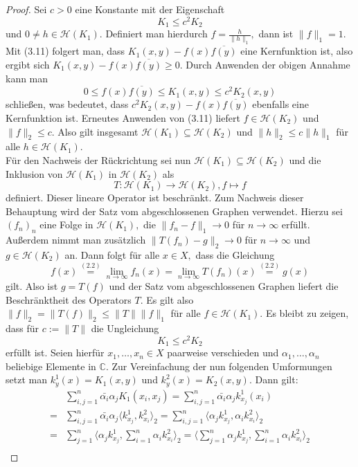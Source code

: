\documentclass[12pt,titlepage,twoside,cleardoublepage]{article}
\theoremstyle{nummermitklammern}
\numberwithin{equation}{section}
\begin{document}
\begin{proof}
Sei $c>0$ eine Konstante mit der Eigenschaft
\[
K_1\leq c^2K_2
\]  und $0 \neq h\in \mathcal{H}(K_1).$ Definiert man hierdurch $f=\frac{h}{\|h\|_1},$ dann ist $\|f\|_1=1.$
 Mit (3.11) folgert man, dass $K_1(x,y)-f(x)\overline{ f(y)}$ eine Kernfunktion ist, also ergibt sich $K_1(x,y)-f(x)\overline{ f(y)}\geq 0.$ 
Durch Anwenden der obigen Annahme kann man 
\[
0\leq f(x)\overline{ f(y)}\leq K_1(x,y)\leq c^2K_2(x,y)
\]
 schließen, was bedeutet, dass  $c^2K_2(x,y)-f(x)\overline{f(y)}$ ebenfalls eine Kernfunktion ist. Erneutes Anwenden von (3.11) liefert $f\in \mathcal{H}(K_2)$ und $\|f\|_2\leq c.$
Also gilt insgesamt $\mathcal{H}(K_1)\subseteq \mathcal{H}(K_2)$ und $\|h\|_2\leq c\|h\|_1$ für alle $h\in \mathcal{H}(K_1).$\\
Für den Nachweis der Rückrichtung sei nun $\mathcal{H}(K_1)\subseteq \mathcal{H}(K_2)$ und die Inklusion von $\mathcal{H}(K_1)$ in $\mathcal{H}(K_2)$ als
\[
T:\mathcal{H}(K_1) \to \mathcal{H}(K_2),f\mapsto f
\] definiert. Dieser lineare Operator ist beschränkt. Zum Nachweis dieser Behauptung wird der Satz vom abgeschlossenen Graphen verwendet.
Hierzu sei $(f_n)_n$ eine Folge in $\mathcal{H}(K_1),$ die $\|f_n-f\|_1\to 0$ für $n\to \infty$ erfüllt. Außerdem nimmt man zusätzlich $\|T(f_n)-g\|_2\to 0 $ für $n\to \infty$ und $g\in \mathcal{H}(K_2)$ an. Dann folgt für alle $x\in X,$ dass die Gleichung
\[
f(x)\overset{(2.2)}{=}\lim_{n\rightarrow \infty} f_n(x)=\lim_{n\rightarrow \infty} T(f_n)(x)\overset{(2.2)}{=}g(x)
\] gilt.
Also ist $g=T(f)$ und der Satz vom abgeschlossenen Graphen liefert die Beschränktheit des Operators $T$. Es gilt also
$\|f\|_2=\|T(f)\|_2\leq \|T\|\|f\|_1$ für alle $f\in \mathcal{H}(K_1).$ Es bleibt zu zeigen, dass für $c:=\|T\|$ die Ungleichung
\[
K_1\leq c^2K_2 
\] erfüllt ist. Seien hierfür $x_1,\ldots, x_n\in X$ paarweise verschieden und $\alpha_1,\ldots ,\alpha_n$ beliebige Elemente in $ \mathbb{C}.$ Zur Vereinfachung der nun folgenden Umformungen setzt man $k^1_y(x)=K_1(x,y)$ und $k^2_y(x)=K_2(x,y).$ Dann gilt:
\begin{align*}
&\sum_{i,j=1}^n\bar{\alpha_i}\alpha_jK_1(x_i,x_j)
=\sum_{i,j=1}^n \bar{\alpha_i}\alpha_j k^1_{x_j}(x_i)\\
=&\sum_{i,j=1}^n \bar{\alpha_i}\alpha_j \langle k^1_{x_j},k^2_{x_i}\rangle_2
=\sum_{i,j=1}^n \langle \alpha_j k^1_{x_j},\alpha_ik^2_{x_i}\rangle_2\\
=&\sum_{j=1}^n \langle \alpha_j k^1_{x_j},\sum_{i=1}^n\alpha_ik^2_{x_i}\rangle_2
= \langle\sum_{j=1}^n \alpha_j k^1_{x_j},\sum_{i=1}^n\alpha_ik^2_{x_i}\rangle_2\\

\end{align*}
\end{proof}
\end{document}
